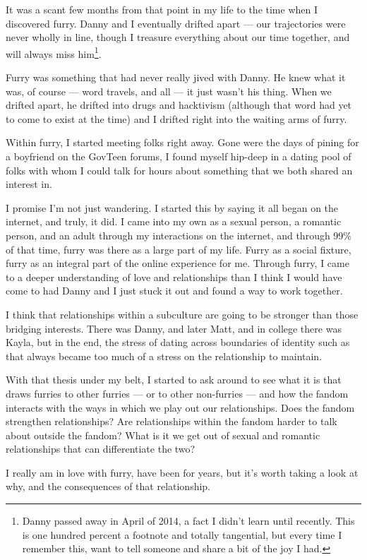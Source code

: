 It was a scant few months from that point in my life to the time when I discovered furry.  Danny and I eventually drifted apart --- our trajectories were never wholly in line, though I treasure everything about our time together, and will always miss him\footnote{Danny passed away in April of 2014, a fact I didn't learn until recently.  This is one hundred percent a footnote and totally tangential, but every time I remember this, want to tell someone and share a bit of the joy I had.}.

Furry was something that had never really jived with Danny.  He knew what it was, of course --- word travels, and all --- it just wasn't his thing.  When we drifted apart, he drifted into drugs and hacktivism (although that word had yet to come to exist at the time) and I drifted right into the waiting arms of furry.

Within furry, I started meeting folks right away.  Gone were the days of pining for a boyfriend on the GovTeen forums, I found myself hip-deep in a dating pool of folks with whom I could talk for hours about something that we both shared an interest in.

I promise I'm not just wandering.  I started this by saying it all began on the internet, and truly, it did.  I came into my own as a sexual person, a romantic person, and an adult through my interactions on the internet, and through 99\% of that time, furry was there as a large part of my life. Furry as a social fixture, furry as an integral part of the online experience for me.  Through furry, I came to a deeper understanding of love and relationships than I think I would have come to had Danny and I just stuck it out and found a way to work together.

I think that relationships within a subculture are going to be stronger than those bridging interests.  There was Danny, and later Matt, and in college there was Kayla, but in the end, the stress of dating across boundaries of identity such as that always became too much of a stress on the relationship to maintain.

With that thesis under my belt, I started to ask around to see what it is that draws furries to other furries --- or to other non-furries --- and how the fandom interacts with the ways in which we play out our relationships.  Does the fandom strengthen relationships?  Are relationships within the fandom harder to talk about outside the fandom?  What is it we get out of sexual and romantic relationships that can differentiate the two?

I really am in love with furry, have been for years, but it's worth taking a look at why, and the consequences of that relationship.
